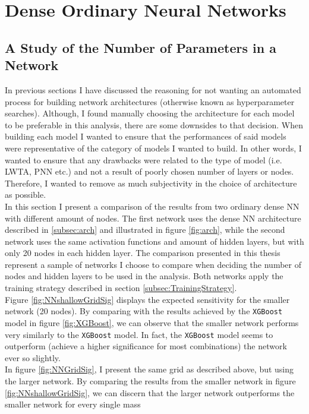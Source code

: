 \section{Dense Ordinary Neural Networks}
\subsection{A Study of the Number of Parameters in a Network}
In previous sections I have discussed the reasoning for not wanting an automated process for building network architectures (otherwise known
as hyperparameter searches). Although, I found manually choosing the architecture for each model to be preferable in this analysis, there 
are some downsides to that decision. When building each model I wanted to ensure that the performances of said models were representative of 
the category of models I wanted to build. In other words, I wanted to ensure that any drawbacks were related to the type of model (i.e. \ac{LWTA}, \ac{PNN} etc.) 
and not a result of poorly chosen number of layers or nodes. Therefore, I wanted to remove as much subjectivity in the choice of architecture as possible.
\\
In this section I present a comparison of the results from two ordinary dense \ac{NN} with different amount of nodes. The first network 
uses the dense \ac{NN} architecture described in \ref{subsec:arch} and illustrated in figure \ref{fig:arch}, while the second network uses the same activation 
functions and amount of hidden layers, but with only 20 nodes in each hidden layer. The comparison presented in this thesis represent a sample of networks I choose to 
compare when deciding the number of nodes and hidden layers to be used in the analysis. Both networks apply the training strategy described in section 
\ref{subsec:TrainingStrategy}.
\\
Figure \ref{fig:NNshallowGridSig} displays the expected sensitivity for the smaller network (20 nodes). By comparing with the 
results achieved by the \verb!XGBoost! model in figure \ref{fig:XGBoost}, we can observe that the smaller network performs very similarly to the \verb!XGBoost! 
model. In fact, the \verb!XGBoost! model seems to outperform (achieve a higher significance for most combinations) the network ever so slightly.
\\
In figure \ref{fig:NNGridSig}, I present the same grid as described above, but using the larger network. By comparing the results from the smaller 
network in figure \ref{fig:NNshallowGridSig}, we can discern that the larger network outperforms the smaller network for every single mass 
